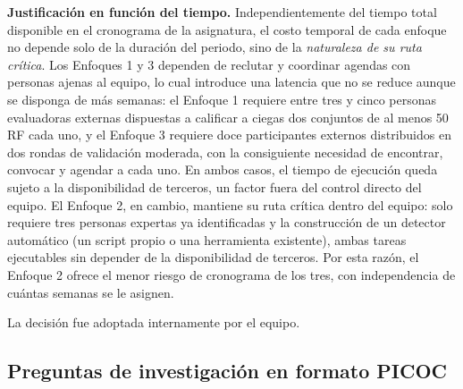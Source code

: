 \documentclass[journal,onecolumn]{IEEEtran}
\begin{document}
	\textbf{Justificación en función del tiempo.} Independientemente del tiempo
	total disponible en el cronograma de la asignatura, el costo temporal de
	cada enfoque no depende solo de la duración del periodo, sino de la
	\emph{naturaleza de su ruta crítica}. Los Enfoques 1 y 3 dependen de
	reclutar y coordinar agendas con personas ajenas al equipo, lo cual introduce
	una latencia que no se reduce aunque se disponga de más semanas: el
	Enfoque 1 requiere entre tres y cinco personas evaluadoras externas
	dispuestas a calificar a ciegas dos conjuntos de al menos 50 RF cada uno, y
	el Enfoque 3 requiere doce participantes externos distribuidos en dos rondas
	de validación moderada, con la consiguiente necesidad de encontrar,
	convocar y agendar a cada uno. En ambos casos, el tiempo de ejecución queda
	sujeto a la disponibilidad de terceros, un factor fuera del control directo
	del equipo. El Enfoque 2, en cambio, mantiene su ruta crítica dentro del
	equipo: solo requiere tres personas expertas ya identificadas y la
	construcción de un detector automático (un script propio o una herramienta
	existente), ambas tareas ejecutables sin depender de la disponibilidad de
	terceros. Por esta razón, el Enfoque 2 ofrece el menor riesgo de cronograma
	de los tres, con independencia de cuántas semanas se le asignen.
	
	La decisión fue adoptada internamente por el equipo.
	
	\subsection{Preguntas de investigación en formato PICOC}
	\label{sec:rq}
	
\end{document}
